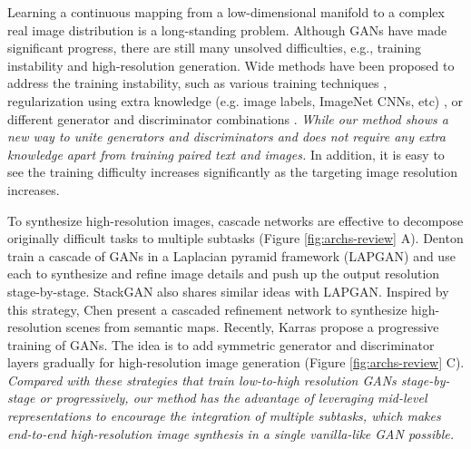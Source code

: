 \documentclass[10pt,twocolumn,letterpaper]{article}
\begin{document}
Learning a continuous mapping from a low-dimensional manifold to a complex real image distribution is a long-standing problem. Although GANs have made significant progress, there are still many unsolved difficulties, e.g., training instability and high-resolution generation. Wide methods have been proposed to address the training instability, such as various training techniques \cite{salimans2016improved,arjovsky2017wasserstein,berthelot2017began,shrivastava2016learning,odena2016conditional}, regularization using extra knowledge (e.g. image labels, ImageNet CNNs, etc) \cite{dosovitskiy2016generating,ledig2016photo,dash2017tac,dash2017tac}, or different generator and discriminator combinations  \cite{metz2016unrolled,durugkar2016generative,yang2017lr,huang2016stacked}. \textit{While our method shows a new way to unite generators and discriminators and does not require any extra knowledge apart from training paired text and images.} In addition, it is easy to see the training difficulty increases significantly as the targeting image resolution increases.


To synthesize high-resolution images, cascade networks are effective to decompose originally difficult tasks to multiple subtasks (Figure \ref{fig:archs-review} A).
Denton \etal \cite{denton2015deep} train a cascade of GANs in a Laplacian pyramid framework (LAPGAN) and use each to synthesize and refine image details and push up the output resolution stage-by-stage. StackGAN also shares similar ideas with LAPGAN. Inspired by this strategy, Chen \etal \cite{chen2017photographic} present a cascaded refinement network to synthesize high-resolution scenes from semantic maps. 
Recently, Karras \etal \cite{Karras2017progressive} propose a progressive training of GANs. The idea is to add symmetric generator and discriminator layers gradually for high-resolution image generation (Figure \ref{fig:archs-review} C). \textit{Compared with these strategies that train low-to-high resolution GANs stage-by-stage or progressively, our method has the advantage of leveraging mid-level representations to encourage the integration of multiple subtasks, which makes end-to-end high-resolution image synthesis in a single vanilla-like GAN possible.}
\end{document}

